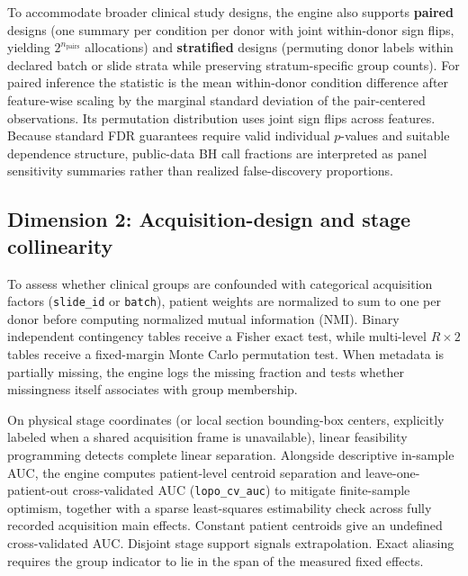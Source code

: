 \documentclass[11pt]{article}
\begin{document}
To accommodate broader clinical study designs, the engine also supports \textbf{paired} designs (one summary per condition per donor with joint within-donor sign flips, yielding $2^{n_{\text{pairs}}}$ allocations) and \textbf{stratified} designs (permuting donor labels within declared batch or slide strata while preserving stratum-specific group counts). For paired inference the statistic is the mean within-donor condition difference after feature-wise scaling by the marginal standard deviation of the pair-centered observations. Its permutation distribution uses joint sign flips across features. Because standard FDR guarantees require valid individual $p$-values and suitable dependence structure, public-data BH call fractions are interpreted as panel sensitivity summaries rather than realized false-discovery proportions.

\subsection{Dimension 2: Acquisition-design and stage collinearity}
To assess whether clinical groups are confounded with categorical acquisition factors (\texttt{slide\_id} or \texttt{batch}), patient weights are normalized to sum to one per donor before computing normalized mutual information (NMI). Binary independent contingency tables receive a Fisher exact test, while multi-level $R \times 2$ tables receive a fixed-margin Monte Carlo permutation test. When metadata is partially missing, the engine logs the missing fraction and tests whether missingness itself associates with group membership.

On physical stage coordinates (or local section bounding-box centers, explicitly labeled when a shared acquisition frame is unavailable), linear feasibility programming detects complete linear separation. Alongside descriptive in-sample AUC, the engine computes patient-level centroid separation and leave-one-patient-out cross-validated AUC (\texttt{lopo\_cv\_auc}) to mitigate finite-sample optimism, together with a sparse least-squares estimability check across fully recorded acquisition main effects. Constant patient centroids give an undefined cross-validated AUC. Disjoint stage support signals extrapolation. Exact aliasing requires the group indicator to lie in the span of the measured fixed effects.
\end{document}
